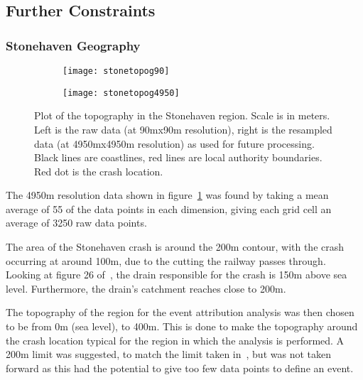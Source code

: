 \subsection{Further Constraints}\label{subsec:furthercons}

\subsubsection{Stonehaven Geography}

\begin{figure}[H]
    \centering
    \begin{subfigure}{0.48\textwidth}
        \centering
        \texttt{[image: stonetopog90]}
    \end{subfigure}
    \hfill
    \begin{subfigure}{0.48\textwidth}
        \centering
        \texttt{[image: stonetopog4950]}
    \end{subfigure}
    \caption[Plot of the topography in the Stonehaven region.]{
        Plot of the topography in the Stonehaven region.
    Scale is in meters.
    Left is the raw data (at 90mx90m resolution),
    right is the resampled data (at 4950mx4950m resolution) as used for future processing.
    Black lines are coastlines, red lines are local authority boundaries.
    Red dot is the crash location.}
    \label{fig:stonetopog}
\end{figure}

The 4950m resolution data shown in figure~\ref{fig:stonetopog} was found by taking a mean average of 55 of the data points in each dimension,
    giving each grid cell an average of 3250 raw data points.

The area of the Stonehaven crash is around the 200m contour,
    with the crash occurring at around 100m,
    due to the cutting the railway passes through.
Looking at figure 26 of~\cite{RAIB_2022},
    the drain responsible for the crash is 150m above sea level.
Furthermore, the drain's catchment reaches close to 200m.

The topography of the region for the event attribution analysis was then chosen to be from 0m (sea level),
    to 400m.
This is done to make the topography around the crash location typical for the region in which the analysis is performed.
A 200m limit was suggested,
    to match the limit taken in~\cite{Tett_Soon},
    but was not taken forward as this had the potential to give too few data points to define an event.

